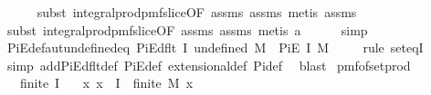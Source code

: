 \begin{isabellebody}
\ \ \ \ \isamarkupfalse%
\ {\isacharparenleft}{\kern0pt}subst\ integral{\isacharunderscore}{\kern0pt}prod{\isacharunderscore}{\kern0pt}pmf{\isacharunderscore}{\kern0pt}slice{\isacharbrackleft}{\kern0pt}OF\ assms{\isacharparenleft}{\kern0pt}{}{\isacharparenright}{\kern0pt}\ assms{\isacharparenleft}{\kern0pt}{}{\isacharparenright}{\kern0pt}{\isacharbrackright}{\kern0pt}{\isacharcomma}{\kern0pt}\ metis\ assms{\isacharparenleft}{\kern0pt}{}{\isacharparenright}{\kern0pt}{\isacharparenright}{\kern0pt}\isanewline
\ \ \ \ \isamarkupfalse%
\ {\isacharparenleft}{\kern0pt}subst\ integral{\isacharunderscore}{\kern0pt}prod{\isacharunderscore}{\kern0pt}pmf{\isacharunderscore}{\kern0pt}slice{\isacharbrackleft}{\kern0pt}OF\ assms{\isacharparenleft}{\kern0pt}{}{\isacharparenright}{\kern0pt}\ assms{\isacharparenleft}{\kern0pt}{}{\isacharparenright}{\kern0pt}{\isacharbrackright}{\kern0pt}{\isacharcomma}{\kern0pt}\ metis\ a{\isacharparenright}{\kern0pt}\isanewline
\ \ \ \ \isamarkupfalse%
\ simp\isanewline
{}\isamarkupfalse%
%
\endisatagproof
{\isafoldproof}%
%
\isadelimproof
\isanewline
%
\endisadelimproof
\isanewline
{}\isamarkupfalse%
\ PiE{\isacharunderscore}{\kern0pt}defaut{\isacharunderscore}{\kern0pt}undefined{\isacharunderscore}{\kern0pt}eq{\isacharcolon}{\kern0pt}\ {\isachardoublequoteopen}PiE{\isacharunderscore}{\kern0pt}dflt\ I\ undefined\ M\ {\isacharequal}{\kern0pt}\ PiE\ I\ M{\isachardoublequoteclose}\ \isanewline
%
\isadelimproof
\ \ %
\endisadelimproof
%
\isatagproof
{}\isamarkupfalse%
\ {\isacharparenleft}{\kern0pt}rule\ set{\isacharunderscore}{\kern0pt}eqI{\isacharparenright}{\kern0pt}\isanewline
\ \ \isamarkupfalse%
\ {\isacharparenleft}{\kern0pt}simp\ add{\isacharcolon}{\kern0pt}PiE{\isacharunderscore}{\kern0pt}dflt{\isacharunderscore}{\kern0pt}def\ PiE{\isacharunderscore}{\kern0pt}def\ extensional{\isacharunderscore}{\kern0pt}def\ Pi{\isacharunderscore}{\kern0pt}def{\isacharparenright}{\kern0pt}\ \isamarkupfalse%
\ blast%
\endisatagproof
{\isafoldproof}%
%
\isadelimproof
\isanewline
%
\endisadelimproof
\isanewline
\isanewline
{}\isamarkupfalse%
\ pmf{\isacharunderscore}{\kern0pt}of{\isacharunderscore}{\kern0pt}set{\isacharunderscore}{\kern0pt}prod{\isacharcolon}{\kern0pt}\isanewline
\ \ \ {\isachardoublequoteopen}finite\ I{\isachardoublequoteclose}\isanewline
\ \ \ {\isachardoublequoteopen}{\isasymAnd}x{\isachardot}{\kern0pt}\ x\ {\isasymin}\ I\ {\isasymLongrightarrow}\ finite\ {\isacharparenleft}{\kern0pt}M\ x{\isacharparenright}{\kern0pt}{\isachardoublequoteclose}\isanewline

\end{isabellebody}
